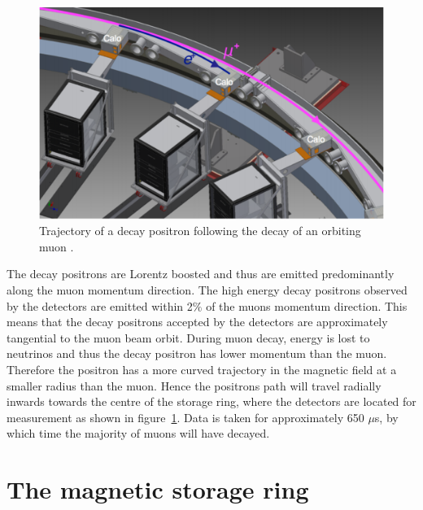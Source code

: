 \begin{figure}[th]
\centering
\includegraphics[scale=0.7]{Figures/positronDecay}
\decoRule
\caption{Trajectory of a decay positron following the decay of an orbiting muon \cite{Reference29}.}
\label{fig:positronDecay}
\end{figure}

The decay positrons are Lorentz boosted and thus are emitted predominantly along the muon momentum direction. The high energy decay positrons observed by the detectors are emitted within 2$\%$ of the muons momentum direction. This means that the decay positrons accepted by the detectors are approximately tangential to the muon beam orbit. During muon decay, energy is lost to neutrinos and thus the decay positron has lower momentum than the muon. Therefore the positron has a more curved trajectory in the magnetic field at a smaller radius than the muon. Hence the positrons path will travel radially inwards towards the centre of the storage ring, where the detectors are located for measurement as shown in figure~\ref{fig:positronDecay}. Data is taken for approximately 650 $\mu$s, by which time the majority of muons will have decayed. 

\section{The magnetic storage ring}


